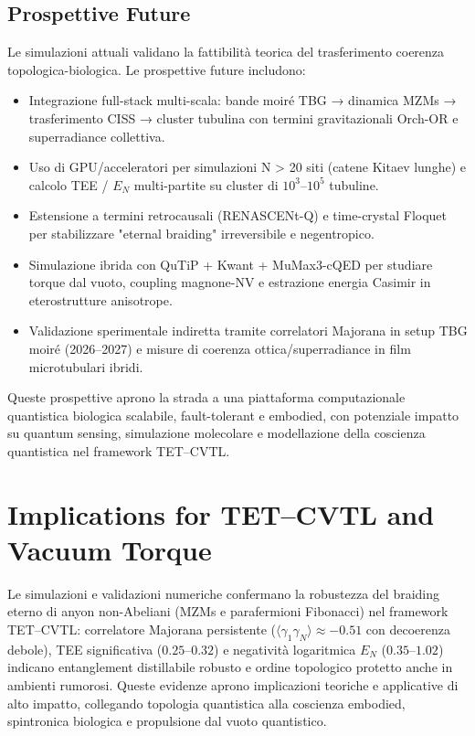 \documentclass[11pt,a4paper]{article}
\theoremstyle{plain}
\theoremstyle{definition}
\begin{document}
\subsection{Prospettive Future}

Le simulazioni attuali validano la fattibilità teorica del trasferimento coerenza topologica-biologica. Le prospettive future includono:

\begin{itemize}
    \item Integrazione full-stack multi-scala: bande moiré TBG → dinamica MZMs → trasferimento CISS → cluster tubulina con termini gravitazionali Orch-OR e superradiance collettiva.
    \item Uso di GPU/acceleratori per simulazioni N > 20 siti (catene Kitaev lunghe) e calcolo TEE / $E_N$ multi-partite su cluster di $10^3$--$10^5$ tubuline.
    \item Estensione a termini retrocausali (RENASCENt-Q) e time-crystal Floquet per stabilizzare "eternal braiding" irreversibile e negentropico.
    \item Simulazione ibrida con QuTiP + Kwant + MuMax3-cQED per studiare torque dal vuoto, coupling magnone-NV e estrazione energia Casimir in eterostrutture anisotrope.
    \item Validazione sperimentale indiretta tramite correlatori Majorana in setup TBG moiré (2026--2027) e misure di coerenza ottica/superradiance in film microtubulari ibridi.
\end{itemize}

Queste prospettive aprono la strada a una piattaforma computazionale quantistica biologica scalabile, fault-tolerant e embodied, con potenziale impatto su quantum sensing, simulazione molecolare e modellazione della coscienza quantistica nel framework TET–CVTL.

\vspace{0.5cm}




\section{Implications for TET--CVTL and Vacuum Torque}

Le simulazioni e validazioni numeriche confermano la robustezza del braiding eterno di anyon non-Abeliani (MZMs e parafermioni Fibonacci) nel framework TET--CVTL: correlatore Majorana persistente ($\langle \gamma_1 \gamma_N \rangle \approx -0.51$ con decoerenza debole), TEE significativa ($0.25$--$0.32$) e negatività logaritmica $E_N$ ($0.35$--$1.02$) indicano entanglement distillabile robusto e ordine topologico protetto anche in ambienti rumorosi. Queste evidenze aprono implicazioni teoriche e applicative di alto impatto, collegando topologia quantistica alla coscienza embodied, spintronica biologica e propulsione dal vuoto quantistico.
\end{document}
